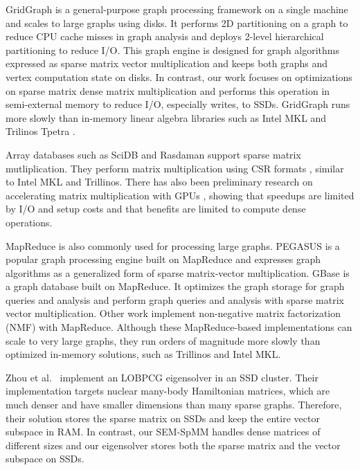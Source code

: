 GridGraph \cite{gridgraph} is a general-purpose graph processing framework on
a single machine
and scales to large graphs using disks. It performs 2D partitioning on a graph
to reduce CPU cache misses in graph analysis and deploys 2-level hierarchical
partitioning to reduce I/O. This graph engine is designed for graph
algorithms expressed as sparse matrix vector multiplication and keeps both
graphs and vertex computation state on disks. In contrast, our work focuses on
optimizations on sparse matrix dense matrix multiplication and performs this
operation in semi-external memory to reduce I/O, especially writes,
to SSDs. GridGraph runs more slowly than in-memory linear algebra libraries
such as Intel MKL \cite{mkl} and Trilinos Tpetra \cite{trilinos}.

Array databases such as SciDB \cite{scidb} and Rasdaman \cite{rasdaman} support
sparse matrix mutliplication. They perform matrix multiplication using CSR
formats \cite{SLACID}, similar to Intel MKL and Trillinos.  There has also been
preliminary research on accelerating matrix multiplication with GPUs \cite{Liu14},
showing that speedups are limited by I/O and setup costs and that benefits
are limited to compute dense operations.


MapReduce \cite{MapReduce} is also commonly used for processing large graphs.
PEGASUS \cite{pegasus} is a popular graph processing engine built on MapReduce
and expresses graph algorithms as a generalized form of sparse matrix-vector
multiplication. GBase \cite{gbase} is a graph database built on MapReduce.
It optimizes the graph storage for graph queries and analysis and perform graph
queries and analysis with sparse matrix vector multiplication.
Other work \cite{Liao14, Yin14, Liu10} implement non-negative matrix
factorization (NMF) with MapReduce. Although these MapReduce-based
implementations can scale to very large graphs, they run orders of
magnitude more slowly than optimized in-memory solutions, such as Trillinos and Intel MKL.

Zhou et al.~\cite{Zhou12} implement an LOBPCG \cite{Arbenz05} eigensolver in
an SSD cluster. Their implementation targets nuclear many-body Hamiltonian
matrices, which are much denser and have smaller dimensions than many sparse
graphs. Therefore, their solution stores the sparse matrix on SSDs and keep
the entire vector subspace in RAM. In contrast, our SEM-SpMM handles dense
matrices of different sizes and our eigensolver stores both the sparse matrix
and the vector subspace on SSDs.

